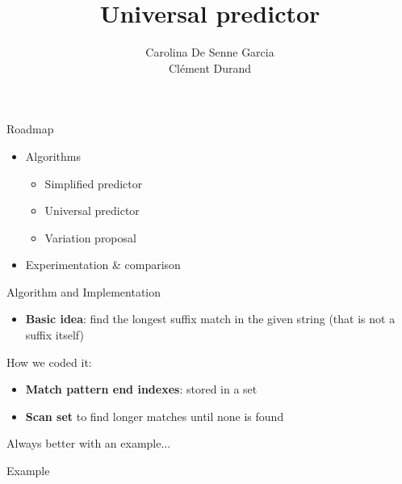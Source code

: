 \documentclass[aspectratio=169]{beamer}
\title[Pattern-based prediction algorithms, applications and variations]
      {Universal predictor}
\author{%
  Carolina De Senne Garcia\\%
  Clément Durand%
}
\begin{document}
\maketitle

\begin{frame}{Roadmap}\Large
  \begin{itemize}
    \item Algorithms
      \begin{itemize}
        \item Simplified predictor
        \item Universal predictor
        \item Variation proposal
      \end{itemize}
    \item Experimentation \& comparison
  \end{itemize}
\end{frame}


\begin{frame}{Algorithm and Implementation}
  \begin{itemize}
    \item \textbf{Basic idea}: find the longest suffix match in the given string (that is not a suffix itself)
  \end{itemize}

  \vspace{\fill}

  How we coded it:
  \begin{itemize}
    \item \textbf{Match pattern end indexes}: stored in a set
    \item \textbf{Scan set} to find longer matches until none is found
  \end{itemize}
  \vspace{\fill}

    Always better with an example...

\end{frame}

\begin{frame}{Example}\centering
  

  
  
  
\end{frame}
\end{document}
